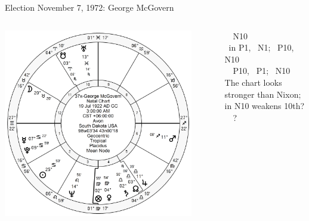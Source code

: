 \begin{frame}[t]{Election November 7, 1972: George McGovern}
\small
\begin{columns}[T, onlytextwidth]
\vspace{-1em}
{\includegraphics[width=0.9\textwidth]{charts/McGovern.png}}
\fontsize{8pt}{9pt}\selectfont

\Sun\, \Trine\, N10 \\
\Venus\, in P1, \Sextile\, N1; \Square\, P10, \Opposition\, N10 \\
\Mars\, \Opposition\, P10, \Square\, P1; \Square\, N10 \\
\vspace{0.5em}
The chart looks stronger than Nixon; \SouthNode\, in N10 weakens 10th? \Mars\, \Square\, \Venus?


\end{columns}
\end{frame}
